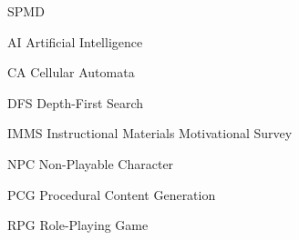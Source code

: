 
\begin{listofabbrv}{SPMD}
  \item[AI] Artificial Intelligence
  \item[CA] Cellular Automata
  \item[DFS] Depth-First Search
  \item[IMMS] Instructional Materials Motivational Survey
  \item[NPC] Non-Playable Character
  \item[PCG] Procedural Content Generation
  \item[RPG] Role-Playing Game
\end{listofabbrv}